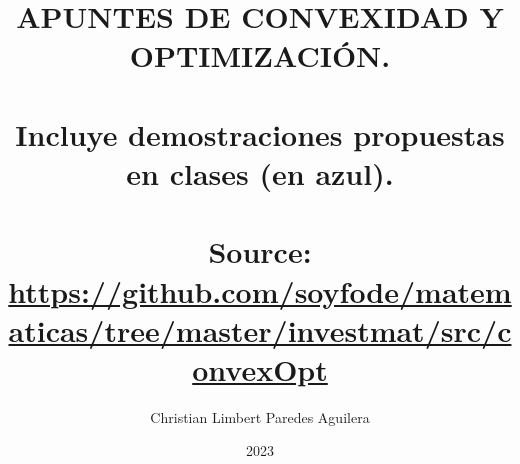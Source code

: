 \title{APUNTES DE CONVEXIDAD Y OPTIMIZACIÓN. \\ \hfill\\ \large  Incluye demostraciones propuestas en clases ({\color{blue}en azul}).\\\hfill \\ \small Source: \url{https://github.com/soyfode/matematicas/tree/master/investmat/src/convexOpt}}
\author{Christian Limbert Paredes Aguilera}
\date{2023}
